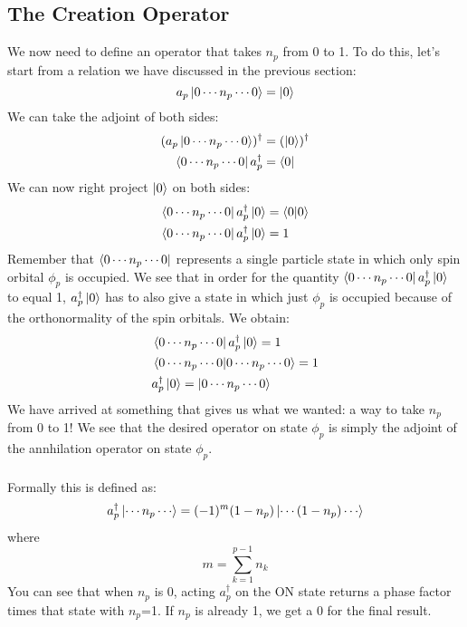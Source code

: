\documentclass{article}
\begin{document}
\subsection{The Creation Operator}
We now need to define an operator that takes $n_p$ from 0 to 1.
To do this, let's start from a relation we have discussed in the previous section: 
\[a_p \ket{0 \cdots n_p \cdots0} = \ket{0} \]
We can take the adjoint of both sides: 
\begin{align*}
(a_p \ket{0 \cdots n_p \cdots0})^\dagger &= (\ket{0})^\dagger \\
\bra{0 \cdots n_p \cdots0} a_p^\dagger &= \bra{0} \\
\end{align*}
We can now right project $\ket{0}$ on both sides: 
\begin{align*}
\bra{0 \cdots n_p \cdots0} a_p^\dagger \ket{0} &= \braket{0 | 0}  \\
\bra{0 \cdots n_p \cdots0} a_p^\dagger \ket{0} &= 1  \\
\end{align*}
Remember that $\bra{0 \cdots n_p \cdots0} $ represents a single particle state in which only spin orbital $\phi_p$ is occupied. 
We see that in order for the quantity $\bra{0 \cdots n_p \cdots0} a_p^\dagger \ket{0}$ to equal 1, $a_p^\dagger \ket{0}$ has to also give a state in which just $\phi_p$ is occupied
because of the orthonormality of the spin orbitals. We obtain:
\begin{align*}
&\bra{0 \cdots n_p \cdots0} a_p^\dagger \ket{0} = 1 \\
&\braket{0 \cdots n_p \cdots0 | 0 \cdots n_p \cdots0 } = 1  \\
&a_p^\dagger \ket{0}  = \ket{0 \cdots n_p \cdots0 } \\
\end{align*}
We have arrived at something that gives us what we wanted: a way to take $n_p$ from 0 to 1! 
We see that the desired operator on state $\phi_p$ is simply the adjoint of the annhilation operator on state $\phi_p$.\\
\\
Formally this is defined as:
\begin{equation}
a_p^\dagger \ket{\cdots n_p \cdots} = (-1)^{m} (1 - n_p) \ket{\cdots (1-n_p) \cdots} 
\end{equation}
where 
\[m = \sum_{k=1}^{p-1} n_k \]
You can see that when $n_p$ is 0, acting $a_p^\dagger$ on the ON state returns a phase factor times that state with $n_p$=1. 
If $n_p$ is already 1, we get a 0 for the final result. \\ \\
\end{document}

